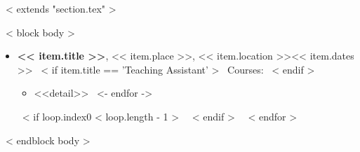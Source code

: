 ~< extends "section.tex" >~

~< block body >~
  \begin{itemize}
    ~< for item in items >~
      \item \textbf{<< item.title >>}, << item.place >>, << item.location >>\hfill << item.dates >>
      ~< if item.title == 'Teaching Assistant' >~
        Courses:
      ~< endif >~
      \vspace{1.2mm}
        \begin{itemize}
          ~< for detail in item.details ->~
            \item <<detail>>
            \vspace{1.2mm}
          ~<- endfor ->~
        \end{itemize}
      ~< if loop.index0 < loop.length - 1 >~
        \vspace{2.5mm}
      ~< endif >~
    ~< endfor >~
  \end{itemize}
~< endblock body >~
